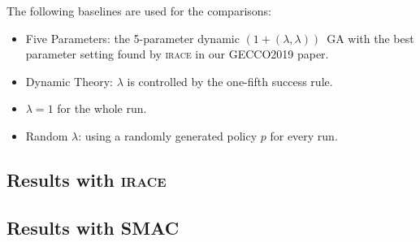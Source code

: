 \documentclass{article}
\newcommand{\opll}{$(1+(\lambda,\lambda))$~GA\xspace}
\newcommand{\irace}{\textsc{irace}\xspace}
\newcommand{\smac}{\textsc{SMAC}\xspace}
\begin{document}
The following baselines are used for the comparisons:
\begin{itemize}
    \item Five Parameters: the 5-parameter dynamic \opll with the best parameter setting found by \irace in our GECCO2019 paper.
    \item Dynamic Theory: $\lambda$ is controlled by the one-fifth success rule.
    \item $\lambda=1$ for the whole run.
    \item Random $\lambda$: using a randomly generated policy $p$ for every run.
\end{itemize}

\subsection{Results with \irace}

\subsection{Results with \smac}
\end{document}
